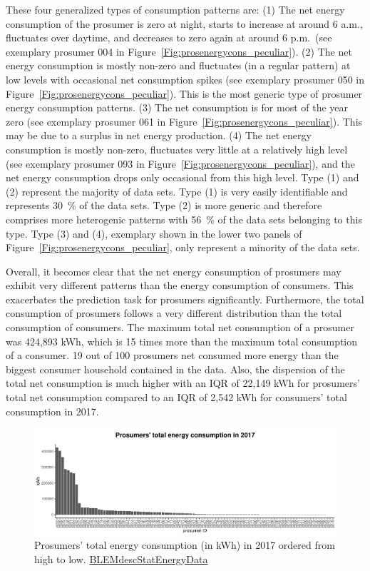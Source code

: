 \noindent These four generalized types of consumption patterns are: (1) The net energy consumption of the prosumer is zero at night, starts to increase at around 6 a.m., fluctuates over daytime, and decreases to zero again at around 6 p.m.~(see exemplary prosumer 004 in Figure~\ref{Fig:prosenergycons_peculiar}). (2) The net energy consumption is mostly non-zero and fluctuates (in a regular pattern) at low levels with occasional net consumption spikes (see exemplary prosumer 050 in Figure~\ref{Fig:prosenergycons_peculiar}). This is the most generic type of prosumer energy consumption patterns. (3) The net consumption is for most of the year zero (see exemplary prosumer 061 in Figure~\ref{Fig:prosenergycons_peculiar}). This may be due to a surplus in net energy production. (4) The net energy consumption is mostly non-zero, fluctuates very little at a relatively high level (see exemplary prosumer 093 in Figure~\ref{Fig:prosenergycons_peculiar}), and the net energy consumption drops only occasional from this high level. Type (1) and (2) represent the majority of data sets. Type (1) is very easily identifiable and represents 30~\% of the data sets. Type (2) is more generic and therefore comprises more heterogenic patterns with 56~\% of the data sets belonging to this type. Type (3) and (4), exemplary shown in the lower two panels of Figure~\ref{Fig:prosenergycons_peculiar}, only represent a minority of the data sets.

Overall, it becomes clear that the net energy consumption of prosumers may exhibit very different patterns than the energy consumption of consumers. This exacerbates the prediction task for prosumers significantly. Furthermore, the total consumption of prosumers follows a very different distribution than the total consumption of consumers. The maximum total net consumption of a prosumer was 424,893 kWh, which is 15 times more than the maximum total consumption of a consumer. 19 out of 100 prosumers net consumed more energy than the biggest consumer household contained in the data. Also, the dispersion of the total net consumption is much higher with an IQR of 22,149 kWh for prosumers' total net consumption compared to an IQR of 2,542 kWh for consumers' total consumption in 2017.

\begin{figure}[H]
 \centering
\includegraphics[width=\textwidth]{thesis/graphs/prosumer_totalconsumption.pdf}
\caption[Prosumers’ total energy consumption in 2017]{Prosumers’ total energy consumption (in kWh) in 2017 ordered from high to low. \quantnet\href{https://github.com/QuantLet/BLEM/tree/master/BLEMdescStatEnergyData}{BLEMdescStatEnergyData}}
\label{Fig:pros_total_consumption}
\end{figure}

